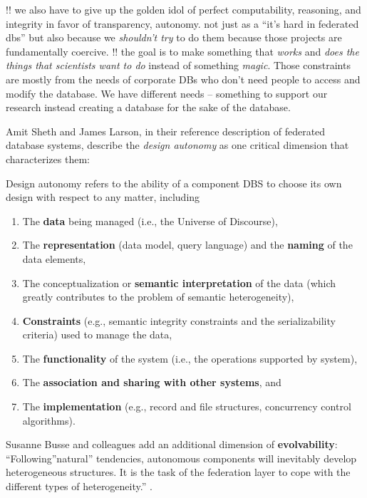 \documentclass[11pt]{article}
\begin{document}
\begin{multicols}{2}
!! we also have to give up the golden idol of perfect computability,
reasoning, and integrity in favor of transparency, autonomy. not just as
a ``it's hard in federated dbs'' but also because we \emph{shouldn't
try} to do them because those projects are fundamentally coercive. !!
the goal is to make something that \emph{works} and \emph{does the
things that scientists want to do} instead of something \emph{magic}.
Those constraints are mostly from the needs of corporate DBs who don't
need people to access and modify the database. We have different needs
-- something to support our research instead creating a database for the
sake of the database.

Amit Sheth and James Larson, in their reference description of federated
database systems, describe the \emph{design autonomy} as one critical
dimension that characterizes them:

\begin{leftbar}
Design autonomy refers to the ability of a component DBS to choose its
own design with respect to any matter, including

\begin{enumerate}
\def\labelenumi{(\alph{enumi})}
\item
  The \textbf{data} being managed (i.e., the Universe of Discourse),
\item
  The \textbf{representation} (data model, query language) and the
  \textbf{naming} of the data elements,
\item
  The conceptualization or \textbf{semantic interpretation} of the data
  (which greatly contributes to the problem of semantic heterogeneity),
\item
  \textbf{Constraints} (e.g., semantic integrity constraints and the
  serializability criteria) used to manage the data,
\item
  The \textbf{functionality} of the system (i.e., the operations
  supported by system),
\item
  The \textbf{association and sharing with other systems}, and
\item
  The \textbf{implementation} (e.g., record and file structures,
  concurrency control algorithms).
\end{enumerate}
\end{leftbar}

Susanne Busse and colleagues add an additional dimension of
\textbf{evolvability}: ``Following''natural'' tendencies, autonomous
components will inevitably develop heterogeneous structures. It is the
task of the federation layer to cope with the different types of
heterogeneity.'' \cite{busseFederatedInformationSystems1999} .


\end{multicols}
\end{document}
